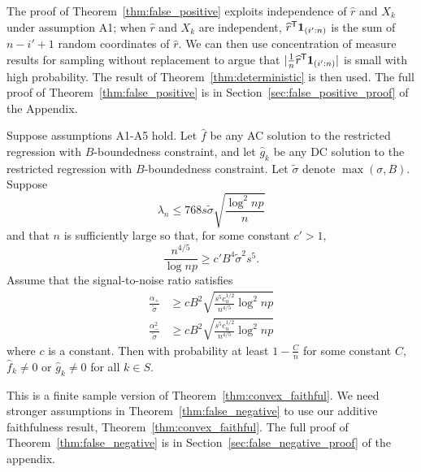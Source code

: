 The proof of Theorem~\ref{thm:false_positive} exploits independence of
$\hat{r}$ and $X_k$ under assumption A1; when $\hat{r}$ and $X_k$ are independent,
$\widehat{r}^{\mathsf{T}} \mbox{\boldmath $1$}_{(i':n)}$ is the sum of $n - i' +1$ random
coordinates of $\hat{r}$.  We can then use concentration of
measure results for sampling without replacement to argue that $|
\frac{1}{n} \widehat{r}^{\mathsf{T}}\mbox{\boldmath $1$}_{(i':n)}|$ is small with high
probability. The result of Theorem~\ref{thm:deterministic} is then
used. The full proof of Theorem~\ref{thm:false_positive} is in
Section~\ref{sec:false_positive_proof} of the Appendix.

\begin{theorem}
\label{thm:false_negative}
Suppose assumptions A1-A5 hold. Let $\hat{f}$ be any AC solution to
the restricted regression with $B$-boundedness constraint, and let
$\hat{g}_k$ be any DC solution to the restricted regression with
$B$-boundedness constraint. Let $\tilde{\sigma}$ denote $\max(\sigma,
B)$.  Suppose 
\begin{equation}
\lambda_n \leq  768 s \tilde{\sigma} \sqrt{\frac{\log^2 np}{n}}
\end{equation}
and that $n$ is sufficiently large so that, for some constant $c' > 1$,
\begin{equation}
\frac{n^{4/5}}{\log np} \geq c' B^4 \tilde{\sigma}^2 s^5.
\end{equation}
Assume that the signal-to-noise ratio satisfies
\begin{align}
\frac{\alpha_{+}}{\tilde{\sigma}} & \geq c B^2
\sqrt{\frac{s^5 c_u^{1/2}}{n^{4/5}} \log^2 np}\\
\frac{\alpha_{-}^2}{\tilde{\sigma}} &\geq c B^2
\sqrt{\frac{s^5 c_u^{1/2}}{n^{4/5}} \log^2 np}
\end{align}
where $c$ is a constant.  Then with probability at least $1 -
\frac{C}{n}$ for some constant $C$, 
$\hat{f}_k \neq 0$ or $\hat{g}_k \neq 0$ 
for all $k \in S$.
\end{theorem}

This is a finite sample version of
Theorem~\ref{thm:convex_faithful}. We need stronger assumptions in
Theorem~\ref{thm:false_negative} to use our additive faithfulness
result, Theorem~\ref{thm:convex_faithful}. The full proof of Theorem~\ref{thm:false_negative} is in Section~\ref{sec:false_negative_proof} of the appendix.

